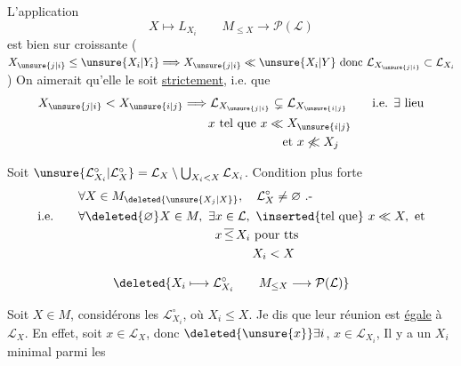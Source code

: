  L'application
\[
 X\longmapsto L_{X_i}\qquad
 M_{\leq X}\longrightarrow\mathcal P(\mathcal{L})
\]
est bien sur croissante ($X_{\unsure{j|i}}\leq \unsure{X_i|Y_i}\Longrightarrow X_{\unsure{j|i}}\ll \unsure{X_i|Y}\text{ donc }\mathcal{L}_{X_{\unsure{j|i}}}\subset \mathcal{L}_{X_i}$) On aimerait qu'elle le soit \uline{strictement}, i.e. que 
\[
\begin{aligned}
 X_{\unsure{j|i}}<X_{\unsure{i|j}}&\Longrightarrow \mathcal{L}_{X_{\unsure{j|i}}}\subsetneq \mathcal{L}_{X_{\unsure{i|j}}}\qquad\text{i.e. }\exists\ \text{lieu}\\
 &\qquad x\ \text{tel que }x\ll X_{\unsure{i|j}}\\
 &\hspace{8em}\text{et }x\not\ll X_j
\end{aligned}
\]

 Soit $\unsure{\mathcal{L}_{X_i}^{\circ}|\mathcal{L}_X^{\circ}}=\mathcal{L}_X\setminus\bigcup_{X_i<X}\mathcal{L}_{X_i}$. Condition plus forte
\[
\begin{aligned}
 &\forall X\in M_{\deleted{\unsure{X_j|X}}},\quad \mathcal{L}_X^{\circ}\ne\varnothing\ \text{.-}\\
 \text{i.e.}\qquad &\forall\deleted{\varnothing}X\in M,\ \exists x\in \mathcal{L},\ \inserted{\text{tel que}}\ x\ll X,\ \text{et}\\
 &\hspace{11em}x\,\overline{\leq}\,X_i\ \text{pour tts}\\
 &\hspace{14em}X_i<X
\end{aligned}
\]

\[
 \deleted{X_i\longmapsto \mathcal{L}_{X_i}^{\circ}\qquad M_{\leq X}\longrightarrow\mathcal P(\mathcal{L})}
\]

Soit $X\in M$, considérons les $\mathcal{L}_{X_i}^{\circ}$, où $X_i\leq X$. Je dis que leur réunion  est \uline{égale} à $\mathcal{L}_X$. En effet, soit $x\in \mathcal{L}_X$, donc $\deleted{\unsure{x}}\exists i$, $x\in \mathcal{L}_{X_i}$,  Il y a un $X_i$ minimal parmi les
